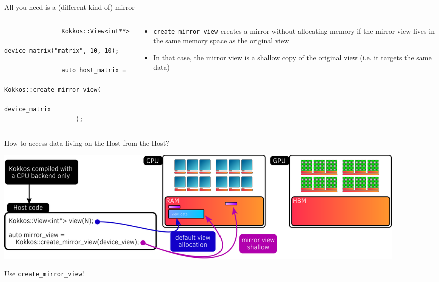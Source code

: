 \documentclass[aspectratio=169]{beamer}
\begin{document}
\begin{frame}[fragile]{All you need is a (different kind of) mirror}
    \begin{columns}
        \begin{column}{0.525\linewidth}
            \begin{verbatim}
                Kokkos::View<int**>
                    device_matrix("matrix", 10, 10);

                auto host_matrix =
                    Kokkos::create_mirror_view(
                        device_matrix
                    );
            \end{verbatim}
        \end{column}
        \begin{column}{0.475\linewidth}
            \begin{itemize}
                \item \texttt{create\_mirror\_view} creates a mirror without allocating memory if the mirror view lives in the same memory space as the original view
                \item In that case, the mirror view is a shallow copy of the original view (i.e. it targets the same data)
            \end{itemize}
        \end{column}
    \end{columns}
\end{frame}


\begin{frame}{How to access data living on the Host from the Host?}
    \begin{center}
        \includegraphics[width=0.9\textwidth]{host_create_mirror_view.png}
    \end{center}

     Use \texttt{create\_mirror\_view}!
\end{frame}

\end{document}
